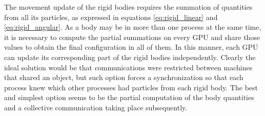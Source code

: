 The movement update of the rigid bodies requires the summation of quantities from all its particles, as expressed in equations \eqref{eq:rigid_linear} and \eqref{eq:rigid_angular}. As a body may be in more than one process at the same time, it is necessary to compute the partial summations on every \ac{GPU} and share those values to obtain the final configuration in all of them. In this manner, each \ac{GPU} can update its corresponding part of the rigid bodies independently. Clearly the ideal solution would be that communications were restricted between machines that shared an object, but such option forces a synchronization so that each process knew which other processes had particles from each rigid body. The best and simplest option seems to be the partial computation of the body quantities and a collective communication taking place subsequently.


